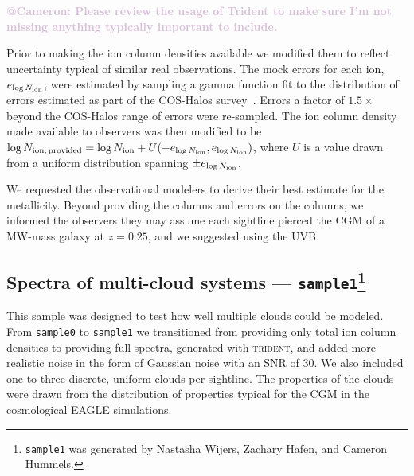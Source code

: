 \documentclass[fleqn,usenatbib]{mnras}
\makeatletter
\newcommand{\atcameron}[1]{\textcolor{Thistle}{\textbf{@Cameron: #1}}}
\makeatother
\begin{document}
\atcameron{Please review the usage of Trident to make sure I'm not missing anything typically important to include.}

Prior to making the ion column densities available we modified them to reflect uncertainty typical of similar real observations.
The mock errors for each ion, $e_{\log N_{\rm ion}}$, were estimated by sampling a gamma function fit to the distribution of errors estimated as part of the COS-Halos survey~\citep{Werk2013}.
Errors a factor of $1.5\times$ beyond the COS-Halos range of errors were re-sampled.
The ion column density made available to observers was then modified to be $\log N_{\rm ion,\,provided} = \log N_{\rm ion} + U(-e_{\log N_{\rm ion}}, e_{\log N_{\rm ion}} )$, where $U$ is a value drawn from a uniform distribution spanning $\pm e_{\log N_{\rm ion}}$.

We requested the observational modelers to derive their best estimate for the metallicity.
Beyond providing the columns and errors on the columns, we informed the observers they may assume each sightline pierced the CGM of a MW-mass galaxy at $z=0.25$, and we suggested using the \cite{Haardt2012} UVB.

\subsection[Spectra of multi-cloud systems --- \texttt{sample1}]{Spectra of multi-cloud systems --- \texttt{sample1}\footnote{
\texttt{sample1} was generated by Nastasha Wijers, Zachary Hafen, and Cameron Hummels.
}}
\label{s: data generation -- sample1}

This sample was designed to test how well multiple clouds could be modeled.
From \texttt{sample0} to \texttt{sample1} we transitioned from providing only total ion column densities to providing full spectra, generated with \textsc{trident}, and added more-realistic noise in the form of Gaussian noise with an SNR of 30.
We also included one to three discrete, uniform clouds per sightline.
The properties of the clouds were drawn from the distribution of properties typical for the CGM in the cosmological \textsc{EAGLE} simulations.
\end{document}
